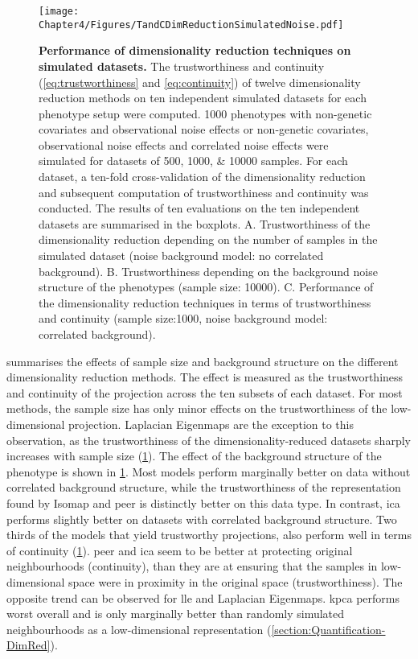 \begin{figure}[hbtp]
	\centering
	\texttt{[image: Chapter4/Figures/TandCDimReductionSimulatedNoise.pdf]}
	\caption[\textbf{Performance of dimensionality reduction techniques on simulated datasets.}]{\textbf{Performance of dimensionality reduction techniques on simulated datasets.} The trustworthiness and continuity (\cref{eq:trustworthiness} and \cref{eq:continuity}) of twelve dimensionality reduction methods on ten independent simulated datasets for each phenotype setup were computed.  \num{1000} phenotypes with non-genetic covariates and observational noise effects or non-genetic covariates, observational noise effects and correlated noise effects were simulated for datasets of \numlist{500;1000; 10000} samples. For each dataset, a ten-fold cross-validation of the dimensionality reduction and subsequent computation of trustworthiness and continuity was conducted. The results of ten evaluations on the ten independent datasets are summarised in the boxplots. A. Trustworthiness of the dimensionality reduction depending on the number of samples in the simulated dataset (noise background model: no correlated background). B. Trustworthiness depending on the background noise structure of the phenotypes (sample size: \num{10000}). C. Performance of the dimensionality reduction techniques in terms of trustworthiness and continuity (sample size:\num{1000}, noise background model: correlated background).}
	 	\label{fig:TaC-noise}
\end{figure}


 summarises the effects of sample size and background structure on the different dimensionality reduction methods. The effect is measured as the trustworthiness and continuity of the projection across the ten subsets of each dataset. For most methods, the sample size has only minor effects on the trustworthiness of the low-dimensional projection. Laplacian Eigenmaps are the exception to this observation, as the trustworthiness of the dimensionality-reduced datasets sharply increases with sample size (\cref{fig:TaC-noise}). The effect of the background structure of the phenotype is shown in \cref{fig:TaC-noise}. Most models perform marginally better on data without correlated background structure, while the trustworthiness of the representation found by Isomap and \gls{peer} is distinctly better on this data type. In contrast, \gls{ica} performs slightly better on datasets with correlated background structure. Two thirds of the models that yield trustworthy projections, also perform well in terms of continuity (\cref{fig:TaC-noise}). \gls{peer} and \gls{ica} seem to be better at protecting original neighbourhoods (continuity), than they are at ensuring that the samples in low-dimensional space were in proximity in the original space (trustworthiness). The opposite trend can be observed for \gls{lle} and Laplacian Eigenmaps. \gls{kpca} performs worst overall and is only marginally better than randomly simulated neighbourhoods as a low-dimensional representation (\cref{section:Quantification-DimRed}).


